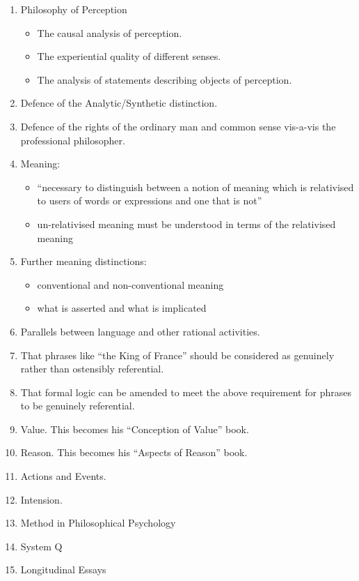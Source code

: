 \documentclass[10pt,titlepage]{book}
\begin{document}
\begin{enumerate}
\item Philosophy of Perception
\begin{itemize}
\item The causal analysis of perception.
\item The experiential quality of different senses.
\item The analysis of statements describing objects of perception.
\end{itemize}

\item Defence of the Analytic/Synthetic distinction.

\item Defence of the rights of the ordinary man and common sense vis-a-vis the professional philosopher.

\item Meaning:
\begin{itemize}
\item ``necessary to distinguish between a notion of meaning which is relativised to users of words or expressions and one that is not''
\item un-relativised meaning must be understood in terms of the relativised meaning
\end{itemize}

\item Further meaning distinctions:
\begin{itemize}
\item conventional and non-conventional meaning
\item what is asserted and what is implicated
\end{itemize}

\item Parallels between language and other rational activities.

\item That phrases like ``the King of France'' should be considered as genuinely rather than ostensibly referential.

\item That formal logic can be amended to meet the above requirement for phrases to be genuinely referential.

\item Value. This becomes his ``Conception of Value'' book.

\item Reason. This becomes his ``Aspects of Reason'' book.

\item Actions and Events.

\item Intension.

\item Method in Philosophical Psychology

\item System Q

\item Longitudinal Essays

\end{enumerate}
\end{document}
